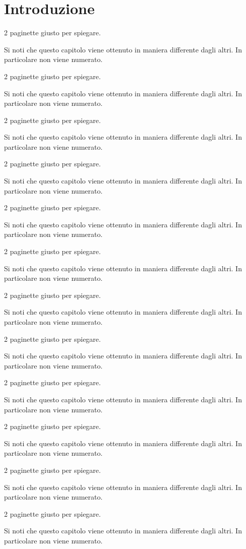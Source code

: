 \chapter*{Introduzione}


2 paginette giusto per spiegare.

Si noti che questo capitolo viene ottenuto in maniera differente
dagli altri. In particolare non viene numerato.

2 paginette giusto per spiegare.

Si noti che questo capitolo viene ottenuto in maniera differente
dagli altri. In particolare non viene numerato.

2 paginette giusto per spiegare.

Si noti che questo capitolo viene ottenuto in maniera differente
dagli altri. In particolare non viene numerato.

2 paginette giusto per spiegare.

Si noti che questo capitolo viene ottenuto in maniera differente
dagli altri. In particolare non viene numerato.

2 paginette giusto per spiegare.

Si noti che questo capitolo viene ottenuto in maniera differente
dagli altri. In particolare non viene numerato.

2 paginette giusto per spiegare.

Si noti che questo capitolo viene ottenuto in maniera differente
dagli altri. In particolare non viene numerato.

2 paginette giusto per spiegare.

Si noti che questo capitolo viene ottenuto in maniera differente
dagli altri. In particolare non viene numerato.

2 paginette giusto per spiegare.

Si noti che questo capitolo viene ottenuto in maniera differente
dagli altri. In particolare non viene numerato.

2 paginette giusto per spiegare.

Si noti che questo capitolo viene ottenuto in maniera differente
dagli altri. In particolare non viene numerato.


2 paginette giusto per spiegare.

Si noti che questo capitolo viene ottenuto in maniera differente
dagli altri. In particolare non viene numerato.

2 paginette giusto per spiegare.

Si noti che questo capitolo viene ottenuto in maniera differente
dagli altri. In particolare non viene numerato.

2 paginette giusto per spiegare.

Si noti che questo capitolo viene ottenuto in maniera differente
dagli altri. In particolare non viene numerato.
